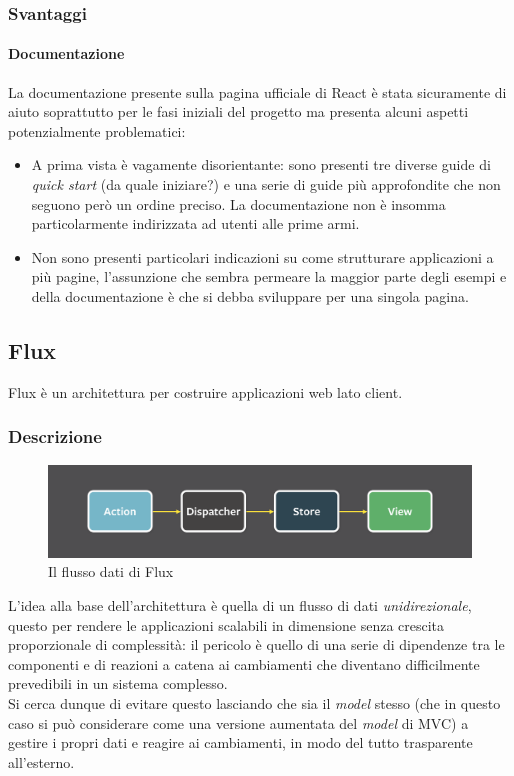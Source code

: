 \subsubsection{Svantaggi}

\paragraph{Documentazione}
La documentazione presente sulla pagina ufficiale di React è stata sicuramente di aiuto
soprattutto per le fasi iniziali del progetto ma presenta alcuni aspetti potenzialmente
problematici:

\begin{itemize}
\item A prima vista è vagamente disorientante: sono presenti tre diverse guide di
\textit{quick start} (da quale iniziare?) e una serie di guide più approfondite che
non seguono però un ordine preciso. La documentazione non è insomma particolarmente
indirizzata ad utenti alle prime armi.
\item Non sono presenti particolari indicazioni su come strutturare applicazioni
a più pagine, l'assunzione che sembra permeare la maggior parte degli esempi e della
documentazione è che si debba sviluppare per una singola pagina.
\end{itemize}

\subsection{Flux}\label{flux}

Flux è un architettura per costruire applicazioni web lato client.

\subsubsection{Descrizione}

\begin{figure}[H]\label{imgFluxDataFlow}
	\centering
	\includegraphics[width=1\columnwidth]{images/flux-data-flow.png}
	\caption{Il flusso dati di Flux}
\end{figure}

L'idea alla base dell'architettura è quella di un flusso di dati \textit{unidirezionale},
questo per rendere le applicazioni scalabili in dimensione senza crescita proporzionale
di complessità: il pericolo è quello di una serie di dipendenze tra le componenti e di reazioni
a catena ai cambiamenti che diventano difficilmente prevedibili in un sistema complesso. \\
Si cerca dunque di evitare questo lasciando che sia il \textit{model} stesso (che in questo caso
si può considerare come una versione aumentata del \textit{model} di MVC) a gestire i propri dati
e reagire ai cambiamenti, in modo del tutto trasparente all'esterno. \\

